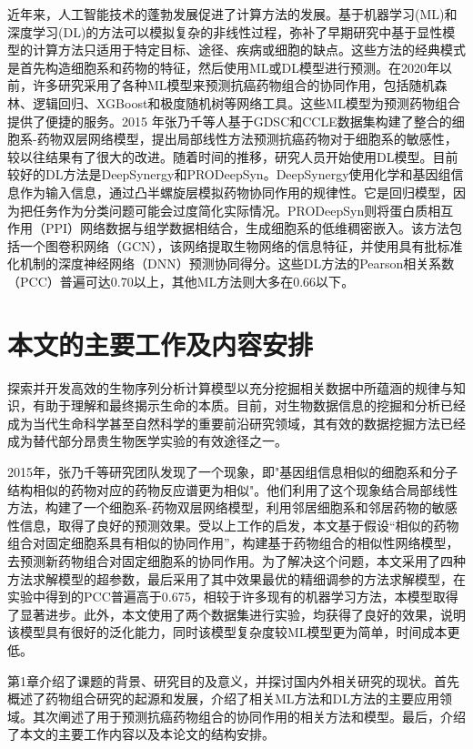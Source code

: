 近年来，人工智能技术的蓬勃发展促进了计算方法的发展。基于机器学习(ML)和深度学习(DL)的方法可以模拟复杂的非线性过程，弥补了早期研究中基于显性模型的计算方法只适用于特定目标、途径、疾病或细胞的缺点\supercite{11}。这些方法的经典模式是首先构造细胞系和药物的特征，然后使用ML或DL模型进行预测。在2020年以前，许多研究采用了各种ML模型来预测抗癌药物组合的协同作用，包括随机森林、逻辑回归、XGBoost和极度随机树等网络工具\supercite{12}。这些ML模型为预测药物组合提供了便捷的服务。2015 年张乃千等人基于GDSC和CCLE数据集构建了整合的细胞系-药物双层网络模型，提出局部线性方法预测抗癌药物对于细胞系的敏感性，较以往结果有了很大的改进\supercite{15}。随着时间的推移，研究人员开始使用DL模型\supercite{22}。目前较好的DL方法是DeepSynergy\supercite{13}和PRODeepSyn\supercite{28}。DeepSynergy使用化学和基因组信息作为输入信息，通过凸半螺旋层模拟药物协同作用的规律性。它是回归模型，因为把任务作为分类问题可能会过度简化实际情况\supercite{14}。PRODeepSyn则将蛋白质相互作用（PPI）网络数据与组学数据相结合，生成细胞系的低维稠密嵌入。该方法包括一个图卷积网络（GCN），该网络提取生物网络的信息特征，并使用具有批标准化机制的深度神经网络（DNN）预测协同得分。这些DL方法的Pearson相关系数（PCC）普遍可达0.70以上，其他ML方法则大多在0.66以下\supercite{28}。

\section{本文的主要工作及内容安排}

探索并开发高效的生物序列分析计算模型以充分挖掘相关数据中所蕴涵的规律与知识，有助于理解和最终揭示生命的本质。目前，对生物数据信息的挖掘和分析已经成为当代生命科学甚至自然科学的重要前沿研究领域，其有效的数据挖掘方法已经成为替代部分昂贵生物医学实验的有效途径之一。

2015年，张乃千等研究团队发现了一个现象，即"基因组信息相似的细胞系和分子结构相似的药物对应的药物反应谱更为相似"。他们利用了这个现象结合局部线性方法，构建了一个细胞系-药物双层网络模型，利用邻居细胞系和邻居药物的敏感性信息，取得了良好的预测效果\supercite{15}。受以上工作的启发，本文基于假设“相似的药物组合对固定细胞系具有相似的协同作用”，构建基于药物组合的相似性网络模型，去预测新药物组合对固定细胞系的协同作用。为了解决这个问题，本文采用了四种方法求解模型的超参数，最后采用了其中效果最优的精细调参的方法求解模型，在实验中得到的PCC普遍高于0.675，相较于许多现有的机器学习方法，本模型取得了显著进步。此外，本文使用了两个数据集进行实验，均获得了良好的效果，说明该模型具有很好的泛化能力，同时该模型复杂度较ML模型更为简单，时间成本更低。

第1章介绍了课题的背景、研究目的及意义，并探讨国内外相关研究的现状。首先概述了药物组合研究的起源和发展，介绍了相关ML方法和DL方法的主要应用领域。其次阐述了用于预测抗癌药物组合的协同作用的相关方法和模型。最后，介绍了本文的主要工作内容以及本论文的结构安排。

